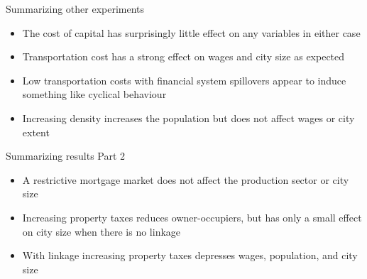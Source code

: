 \documentclass[]{beamer} %
\begin{document}

\begin{frame}{Summarizing other experiments} \Large
\begin {itemize}[<+-|alert@+>]

\item  The cost of capital has surprisingly little effect on any variables in either case

\item  Transportation cost has a strong effect on wages and city size as expected 
 
\item Low transportation costs with financial system spillovers appear to induce something like cyclical behaviour

\item  Increasing density increases the population but does not affect wages or city extent
\end{itemize}
\end{frame}%





\begin{frame}{Summarizing results Part 2 } \Large
\begin {itemize}[<+-|alert@+>]
\item A restrictive mortgage market does not affect the production sector or city size

\item  Increasing property taxes reduces owner-occupiers, but has only a small effect on city size when there is no linkage 
 
\item  With linkage increasing property taxes depresses wages, population, and city size
\end{itemize}
\end{frame}%
\end{document}
